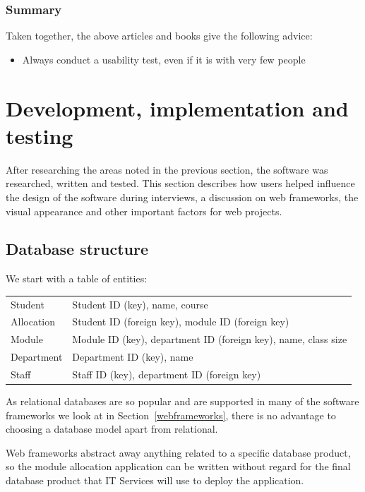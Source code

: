 \documentclass[]{scrartcl}
\begin{document}
\subsubsection{Summary}

Taken together, the above articles and books give the following advice:

\begin{itemize}
  \item Always conduct a usability test, even if it is with very few people
\end{itemize}

\section{Development, implementation and testing}


After researching the areas noted in the previous section, the software was
researched, written and tested. This section describes how users helped
influence the design of the software during interviews, a discussion on web
frameworks, the visual appearance and other important factors for web
projects.

\subsection{Database structure}

We start with a table of entities:

\begin{tabular}{ l l }
  Student    & Student ID (key), name, course \\
  Allocation & Student ID (foreign key), module ID (foreign key) \\
  Module     & Module ID (key), department ID (foreign key), name, class size \\
  Department & Department ID (key), name \\
  Staff      & Staff ID (key), department ID (foreign key) \\
\end{tabular}

As relational databases are so popular and are supported in many of the
software frameworks we look at in Section~\ref{webframeworks}, there is no
advantage to choosing a database model apart from relational.

Web frameworks abstract away anything related to a specific database product,
so the module allocation application can be written without regard for the
final database product that IT Services will use to deploy the application.
\end{document}
